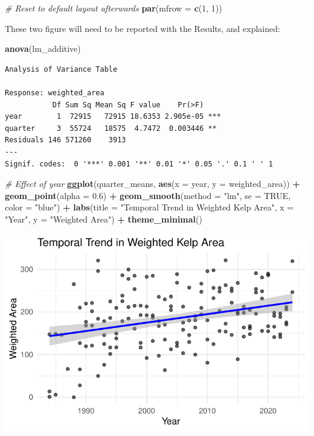 \documentclass[
  british,
  10pt,
]{article}
\newenvironment{Shaded}{\begin{snugshade}}{\end{snugshade}}
\newcommand{\AttributeTok}[1]{\textcolor[rgb]{0.13,0.29,0.53}{#1}}
\newcommand{\CommentTok}[1]{\textcolor[rgb]{0.56,0.35,0.01}{\textit{#1}}}
\newcommand{\ConstantTok}[1]{\textcolor[rgb]{0.56,0.35,0.01}{#1}}
\newcommand{\DecValTok}[1]{\textcolor[rgb]{0.00,0.00,0.81}{#1}}
\newcommand{\FloatTok}[1]{\textcolor[rgb]{0.00,0.00,0.81}{#1}}
\newcommand{\FunctionTok}[1]{\textcolor[rgb]{0.13,0.29,0.53}{\textbf{#1}}}
\newcommand{\NormalTok}[1]{#1}
\newcommand{\SpecialCharTok}[1]{\textcolor[rgb]{0.81,0.36,0.00}{\textbf{#1}}}
\newcommand{\StringTok}[1]{\textcolor[rgb]{0.31,0.60,0.02}{#1}}
\begin{document}
\begin{Shaded}
\begin{Highlighting}[]
\CommentTok{\# Reset to default layout afterwards}
\FunctionTok{par}\NormalTok{(}\AttributeTok{mfrow =} \FunctionTok{c}\NormalTok{(}\DecValTok{1}\NormalTok{, }\DecValTok{1}\NormalTok{))}
\end{Highlighting}
\end{Shaded}

These two figure will need to be reported with the Results, and
explained:

\begin{Shaded}
\begin{Highlighting}[]
\FunctionTok{anova}\NormalTok{(lm\_additive)}
\end{Highlighting}
\end{Shaded}

\begin{verbatim}
Analysis of Variance Table

Response: weighted_area
           Df Sum Sq Mean Sq F value    Pr(>F)    
year        1  72915   72915 18.6353 2.905e-05 ***
quarter     3  55724   18575  4.7472  0.003446 ** 
Residuals 146 571260    3913                      
---
Signif. codes:  0 '***' 0.001 '**' 0.01 '*' 0.05 '.' 0.1 ' ' 1
\end{verbatim}

\begin{Shaded}
\begin{Highlighting}[]
\CommentTok{\# Effect of year}
\FunctionTok{ggplot}\NormalTok{(quarter\_means, }\FunctionTok{aes}\NormalTok{(}\AttributeTok{x =}\NormalTok{ year, }\AttributeTok{y =}\NormalTok{ weighted\_area)) }\SpecialCharTok{+}
  \FunctionTok{geom\_point}\NormalTok{(}\AttributeTok{alpha =} \FloatTok{0.6}\NormalTok{) }\SpecialCharTok{+}
  \FunctionTok{geom\_smooth}\NormalTok{(}\AttributeTok{method =} \StringTok{"lm"}\NormalTok{, }\AttributeTok{se =} \ConstantTok{TRUE}\NormalTok{, }\AttributeTok{color =} \StringTok{"blue"}\NormalTok{) }\SpecialCharTok{+}
  \FunctionTok{labs}\NormalTok{(}\AttributeTok{title =} \StringTok{"Temporal Trend in Weighted Kelp Area"}\NormalTok{, }\AttributeTok{x =} \StringTok{"Year"}\NormalTok{, }\AttributeTok{y =} \StringTok{"Weighted Area"}\NormalTok{) }\SpecialCharTok{+}
  \FunctionTok{theme\_minimal}\NormalTok{()}
\end{Highlighting}
\end{Shaded}

\begin{center}
\includegraphics[width=0.6\linewidth,height=\textheight,keepaspectratio]{BCB744_Biostats_Prac_Exam_2025_files/figure-pdf/chunk13-1.pdf}
\end{center}
\end{document}
